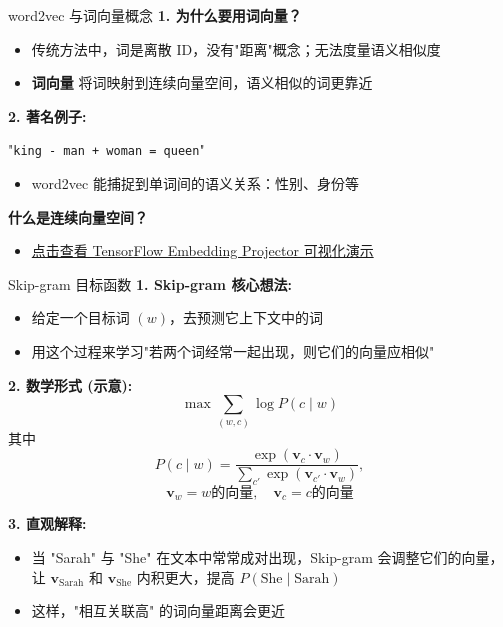 \documentclass{beamer}
\begin{document}
\begin{frame}{word2vec 与词向量概念}
  \textbf{1. 为什么要用词向量？}
  \begin{itemize}[<+->]
    \item 传统方法中，词是离散 ID，没有"距离"概念；无法度量语义相似度
    \item \textbf{词向量} 将词映射到连续向量空间，语义相似的词更靠近
  \end{itemize}
  \vspace{1em}
  \textbf{2. 著名例子:}
  \begin{block}{}
    "\texttt{king - man + woman = queen}"
  \end{block}
  \begin{itemize}[<+->]
    \item word2vec 能捕捉到单词间的语义关系：性别、身份等
  \end{itemize}
  \vspace{1em}
  \textbf{什么是连续向量空间？}
  \begin{itemize}
    \item \href{https://projector.tensorflow.org/}{点击查看 TensorFlow Embedding Projector 可视化演示}  
  \end{itemize}

\end{frame}

\begin{frame}{Skip-gram 目标函数}
  \textbf{1. Skip-gram 核心想法:}
  \begin{itemize}
    \item 给定一个目标词 $(w)$，去预测它上下文中的词
    \item 用这个过程来学习"若两个词经常一起出现，则它们的向量应相似"
  \end{itemize}

  \textbf{2. 数学形式 (示意):}
  \[
    \max \sum_{(w, c)} \log P(c \mid w)
  \]
  其中
  \[
    P(c \mid w) = \frac{\exp(\mathbf{v}_c \cdot \mathbf{v}_w)}{\sum_{c'} \exp(\mathbf{v}_{c'} \cdot \mathbf{v}_w)},
  \]
  \[
    \mathbf{v}_w = w\text{的向量}, \quad \mathbf{v}_c = c\text{的向量}
  \]

  \textbf{3. 直观解释:}
  \begin{itemize}
    \item 当 "Sarah" 与 "She" 在文本中常常成对出现，Skip-gram 会调整它们的向量，让 $\mathbf{v}_{\text{Sarah}}$ 和 $\mathbf{v}_{\text{She}}$ 内积更大，提高 $P(\text{She} \mid \text{Sarah})$
    \item 这样，"相互关联高" 的词向量距离会更近
  \end{itemize}
\end{frame}
\end{document}
